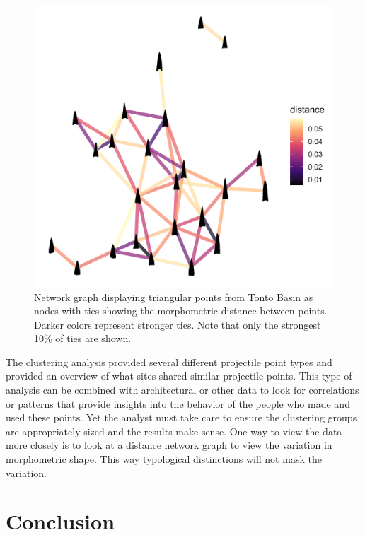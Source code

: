 \documentclass[a4paper]{article}
\begin{document}
\begin{figure}
\includegraphics[width=1\linewidth]{figures/TontoTriangularDistanceNetwork} \caption{Network graph displaying triangular points from Tonto Basin as nodes with ties showing the morphometric distance between points. Darker colors represent stronger ties. Note that only the strongest 10\% of ties are shown.}\label{fig:TontoTriangularDistanceNetwork}
\end{figure}

The clustering analysis provided several different projectile point types and provided an overview of what sites shared similar projectile points. This type of analysis can be combined with architectural or other data to look for correlations or patterns that provide insights into the behavior of the people who made and used these points. Yet the analyst must take care to ensure the clustering groups are appropriately sized and the results make sense. One way to view the data more closely is to look at a distance network graph to view the variation in morphometric shape. This way typological distinctions will not mask the variation.

\hypertarget{conclusion}{%
\section*{Conclusion}\label{conclusion}}
\end{document}
